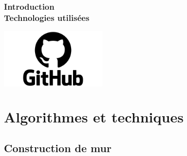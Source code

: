 \documentclass{beamer}
\begin{document}
\begin{frame}
    \frametitle{Introduction \\
                \small Technologies utilisées}
    \hspace{5mm}
    \hspace{-1mm}
    \hspace{-15mm}
    \includegraphics[width=0.40\textwidth]{images/github.png}
\end{frame}

\section{Algorithmes et techniques}

\subsection{Construction de mur}
\end{document}
